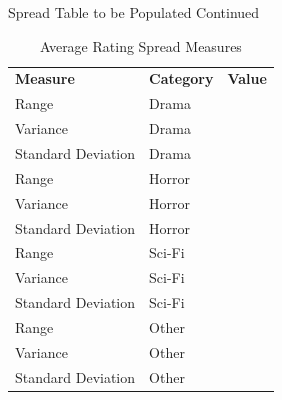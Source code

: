\documentclass[pdf]{beamer}
\theoremstyle{remark}
\theoremstyle{definition}
\begin{document}
\begin{frame}[t]{Spread Table to be Populated Continued}
\begin{table}[htbp]
  \centering
    \captionsetup{justification=centering}
    \begin{tabular}{llr}
    \rowcolor[rgb]{ .851,  .882,  .949} \textbf{Measure} & \textbf{Category} & \multicolumn{1}{l}{\textbf{Value}} \\
    Range  & Drama &  \\
    Variance & Drama &  \\
    Standard Deviation & Drama &  \\
    Range  & Horror &  \\
    Variance & Horror &  \\
    Standard Deviation & Horror &  \\
    Range  & Sci-Fi &  \\
    Variance & Sci-Fi &  \\
    Standard Deviation & Sci-Fi &  \\
    Range  & Other &  \\
    Variance & Other &  \\
    Standard Deviation & Other &  \\
   \end{tabular}%
  \caption{Average Rating Spread Measures}
  \label{tab:averageratingst}%
\end{table}%
\end{frame}
\end{document}
